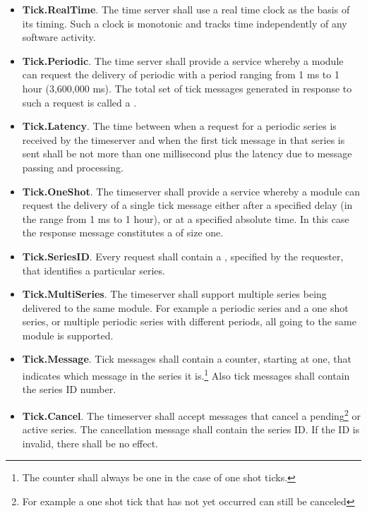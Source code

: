 \begin{itemize}
\item \textbf{Tick.RealTime}. The time server shall use a real time clock as the basis of its
  timing. Such a clock is monotonic and tracks time independently of any software activity.
\item \textbf{Tick.Periodic}. The time server shall provide a service whereby a module can
  request the delivery of periodic  with a period ranging from 1 ms to 1
  hour (3,600,000 ms). The total set of tick messages generated in response to such a request is
  called a .
\item \textbf{Tick.Latency}. The time between when a request for a periodic series is received
  by the timeserver and when the first tick message in that series is sent shall be not more
  than one millisecond plus the latency due to message passing and processing.
\item \textbf{Tick.OneShot}. The timeserver shall provide a service whereby a module can
  request the delivery of a single tick message either after a specified delay (in the range
  from 1 ms to 1 hour), or at a specified absolute time. In this case the response message
  constitutes a  of size one.
\item \textbf{Tick.SeriesID}. Every request shall contain a , specified by
  the requester, that identifies a particular series.
\item \textbf{Tick.MultiSeries}. The timeserver shall support multiple series being
  delivered to the same module. For example a periodic series and a one shot series, or multiple
  periodic series with different periods, all going to the same module is supported.
\item \textbf{Tick.Message}. Tick messages shall contain a counter, starting at one, that
  indicates which message in the series it is.\footnote{The counter shall always be one in the
  case of one shot ticks.} Also tick messages shall contain the series ID number.
\item \textbf{Tick.Cancel}. The timeserver shall accept messages that cancel a
  pending\footnote{For example a one shot tick that has not yet occurred can still be canceled}
  or active series. The cancellation message shall contain the series ID. If the ID is invalid,
  there shall be no effect. 
\end{itemize}

